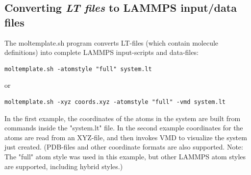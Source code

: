 \documentclass[11pt]{article}
\begin{document}


%
%

\subsection{Converting \textit{LT files} to LAMMPS input/data files}
The moltemplate.sh program converts LT-files (which contain 
molecule definitions) into complete LAMMPS input-scripts and data-files:
\begin{verbatim}
moltemplate.sh -atomstyle "full" system.lt
\end{verbatim}
     or
\begin{verbatim}
moltemplate.sh -xyz coords.xyz -atomstyle "full" -vmd system.lt
\end{verbatim}
In the first example, the coordinates of the atoms in the 
system are built from commands inside the "system.lt" file.
In the second example coordinates for the atoms are read from an XYZ-file,
and then invokes VMD to visualize the system just created. 
(PDB-files and other coordinate formats are also supported.
Note: The "full" atom style was used in this example, but other
LAMMPS atom styles are supported, including hybrid styles.)
\end{document}
